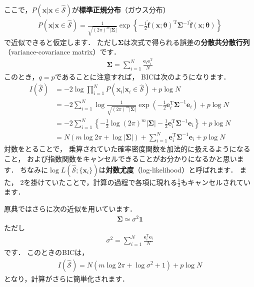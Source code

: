 ﻿\documentclass{jsarticle}
\begin{document}
ここで，$P(\bm{x}|\bm{x}\in\hat{\mathcal{S}})$が{\bf 標準正規分布}（ガウス分布）
\begin{align*}
P(\bm{x}|\bm{x}\in\hat{\mathcal{S}})
=\frac{1}{\sqrt{(2\pi)^{m}|\bm{\Sigma}|}}\exp\left\{-\frac{1}{2}
\hat{\bm{f}}(\bm{x};\bm{\theta})^{\mathrm{T}}
\bm{\Sigma}^{-1}
\hat{\bm{f}}(\bm{x};\bm{\theta})
\right\}
\end{align*}
で近似できると仮定します．
ただし$\bm{\Sigma}$は次式で得られる誤差の{\bf 分散共分散行列}（variance-covariance matrix）です．
\begin{align*}
\bm{\Sigma}=\sum_{i=1}^{N}\frac{\bm{e}_{i}\bm{e}_{i}^{\mathrm{T}}}{N}
\end{align*}
このとき，$q=p$であることに注意すれば，
BICは次のようになります．
\begin{align*}
I(\hat{\mathcal{S}})
&=-2\log\prod_{i=1}^{N}P(\bm{x}_{i}|\bm{x}_{i}\in\hat{\mathcal{S}})+p\log N
 \nonumber \\
&=-2\sum_{i=1}^{N} \log
\frac{1}{\sqrt{(2\pi)^{m}|\bm{\Sigma}|}}\exp\left(-\frac{1}{2}\bm{e}_{i}^{\mathrm{T}}\bm{\Sigma}^{-1}\bm{e}_{i}\right)
+p\log N
 \nonumber \\
&=-2\sum_{i=1}^{N}\left\{
-\frac{1}{2}\log (2\pi)^{m}|\bm{\Sigma}|
-\frac{1}{2}\bm{e}_{i}^{\mathrm{T}}\bm{\Sigma}^{-1}\bm{e}_{i}
 \right\}
+p\log N
 \nonumber \\
&= N ( m\log 2\pi +\log |\bm{\Sigma}| )
+\sum_{i=1}^{N}\bm{e}_{i}^{\mathrm{T}}\bm{\Sigma}^{-1}\bm{e}_{i}
+p\log N
\end{align*}
対数をとることで，
乗算されていた確率密度関数を加法的に扱えるようになること，
および指数関数をキャンセルできることがお分かりになるかと思います．
ちなみに$\log L(\hat{\mathcal{S}};\{\bm{x}_{i}\})$は{\bf 対数尤度}（log-likelihood）と呼ばれます．
また，
2を掛けていたことで，計算の過程で各項に現れる$\frac{1}{2}$もキャンセルされています．

原典ではさらに次の近似を用いています．
\begin{align*}
\bm{\Sigma}\simeq\sigma^{2}\bm{1}
\end{align*}
ただし
\begin{align*}
\sigma^{2}=\sum_{i=1}^{N}\frac{\bm{e}_{i}^{\mathrm{T}}\bm{e}_{i}}{N}
\end{align*}
です．
このときのBICは，
\begin{align*}
I(\hat{\mathcal{S}})= N ( m\log 2\pi +\log \sigma^{2} + 1 ) +p\log N
\end{align*}
となり，計算がさらに簡単化されます．
\end{document}
